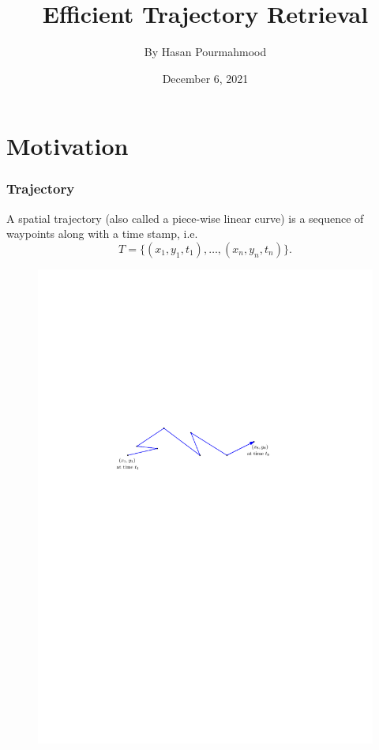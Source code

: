 \documentclass{beamer}
\title{Efficient Trajectory Retrieval}
\author{By Hasan Pourmahmood}
\date{December 6, 2021}
\begin{document}
\frame{\titlepage}


\section{Motivation}

\begin{frame} 
\frametitle{Trajectory}
\begin{block}{}
A spatial trajectory (also called a piece-wise linear curve) is a sequence of waypoints along with a time stamp, i.e. 
$$T=\{(x_1, y_1, t_1), \ldots, (x_n, y_n, t_n)\}.$$
\begin{figure}[h] 
\includegraphics[width=0.8 \textwidth]{trajectory} 
\end{figure}  \vspace{-1mm}
\end{block} 
\end{frame}
\end{document}

